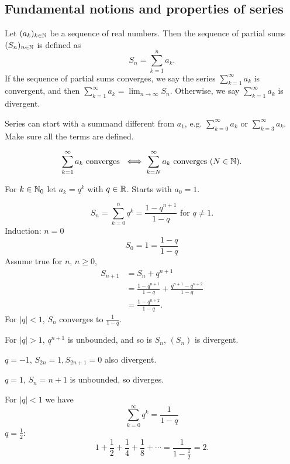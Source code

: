 \documentclass[10pt, a4paper]{article}
\newcommand{\dseq}[2][n]{(#2_#1)_{#1 \in \N}}
\newcommand{\infsum}[1][k = 1]{\sum_{#1}^{\infty}}
\begin{document}
\subsection{Fundamental notions and properties of series}

\begin{definition}
    Let $\dseq[k]{a}$ be a sequence of real numbers.
    Then the sequence of partial sums $\dseq{S}$ is defined as
    \[
    S_n = \sum_{k = 1}^{n}a_k.
    \]
    If the sequence of partial sums converges,
    we say the series $\sum_{k = 1}^{\infty}a_k$ is convergent,
    and then $\sum_{k = 1}^{\infty}a_k = \lim_{n \rightarrow \infty}S_n$.
    Otherwise,
    we say $\sum_{k = 1}^{\infty}a_k$ is divergent.
\end{definition}

\begin{remark}
    Series can start with a summand different from $a_1$,
    e.g.
    $\infsum[k = 0]a_k$ or $\infsum[k = 3]a_k$.
    Make sure all the terms are defined.
\end{remark}

\[
\infsum a_k\text{ converges } \iff \infsum[k = N]a_k\text{ converges } (N \in \N).
\]
\begin{example}
    For $k \in \mathbb{N}_0$ let $a_k = q ^ k$ with $q \in \mathbb{R}$.
    Starts with $a_0 = 1$.

    \[
    S_n = \sum_{k = 0}^{n}q ^ k = \frac{1 - q ^ {n + 1}}{1 - q}\text{ for } q \neq 1.
    \]
    Induction:
    $n = 0$
    \[
    S_0 = 1 = \frac{1 - q}{1 - q}
    \]
    Assume true for $n$, $n \geq 0$,
    \begin{align*}
        S_{n + 1} &= S_n + q ^ {n + 1} \\
        &= \frac{1 - q ^ {n + 1}}{1 - q} + \frac{q ^ {n + 1} - q ^ {n + 2}}{1 - q} \\
        &= \frac{1 - q ^ {n + 2}}{1 - q}.
    \end{align*}
    For $|q| < 1$,
    $S_n$ converges to $\frac{1}{1 - q}$.

    For $|q| > 1$,
    $q ^ {n + 1}$ is unbounded,
    and so is $S_n$,
    $(S_n)$ is divergent.

    $q = -1$,
    $S_{2n} = 1, S_{2n + 1} = 0$ also divergent.
    
    $q = 1$,
    $S_n = n + 1$ is unbounded,
    so diverges.

    For $|q| < 1$ we have
    \[
    \infsum[k = 0]q ^ k = \frac{1}{1 - q}
    \]
    $q = \frac{1}{2}$:
    \[
    1 + \frac{1}{2} + \frac{1}{4} + \frac{1}{8} + \dotsi = \frac{1}{1 - \frac{1}{2}} = 2.
    \]
\end{example}
\end{document}
